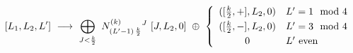 \begin{equation}\label{mmDAflowVI}
\hspace*{-2cm}[L_{1},L_{2},L']\  \longrightarrow \ \makebox[10cm][l]{$
\displaystyle \bigoplus_{J< \frac{k}{2}}\ 
N^{(k)}_{(L'-1)\,\frac{k}{2}}{}^{J}\ [J,L_{2},0]\ \oplus \
\left\{ 
\begin{array}{cl}
([ \frac{k}{2} , + ],L_{2},0) & L'=1 \mod 4 \\[1mm]
{ ([ \frac{k}{2} , - ],L_{2},0)} & L'=3 \mod 4 \\[1mm] 
0 & L' \mbox{ even}
\end{array} 
\right. 
$ }
\end{equation}

